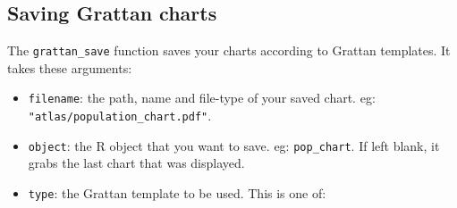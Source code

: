\documentclass[]{book}
\providecommand{\tightlist}{%
  \setlength{\itemsep}{0pt}\setlength{\parskip}{0pt}}
\begin{document}
\hypertarget{saving-grattan-charts}{%
\subsection{Saving Grattan charts}\label{saving-grattan-charts}}

The \texttt{grattan\_save} function saves your charts according to Grattan templates. It takes these arguments:

\begin{itemize}
\tightlist
\item
  \texttt{filename}: the path, name and file-type of your saved chart. eg: \texttt{"atlas/population\_chart.pdf"}.
\item
  \texttt{object}: the R object that you want to save. eg: \texttt{pop\_chart}. If left blank, it grabs the last chart that was displayed.
\item
  \texttt{type}: the Grattan template to be used. This is one of:


\end{itemize}
\end{document}
